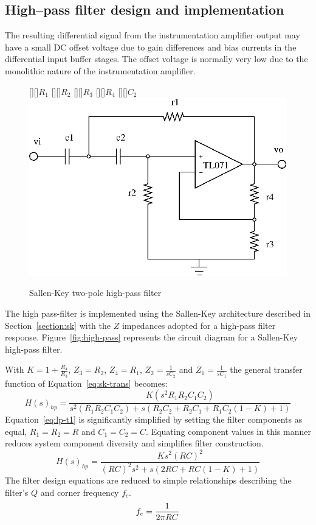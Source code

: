 \subsection{High--pass filter design and implementation}
The resulting differential signal from the instrumentation amplifier
output may have a small DC offset voltage due to gain differences and
bias currents in the differential input buffer stages. The offset
voltage is normally very low due to the monolithic nature of the
instrumentation amplifier.

\begin{figure}[htbp]
	[][]{$R_1$} 
	[][]{$R_2$} 
	[][]{$R_3$} 
	[][]{$R_4$} 
	[][]{$C_2$} 
	\psfrag{+}{+}
	\psfrag{-}{--}
	\includegraphics{high-pass.eps}
	\caption{Sallen-Key two-pole high-pass filter}
	\label{fig:high-pass} 
\end{figure}

The high pass-filter is implemented using the Sallen-Key architecture
described in Section~\vref{section:sk} with the $Z$ impedances adopted
for a high-pass filter response. Figure~\vref{fig:high-pass}
represents the circuit diagram for a Sallen-Key high-pass filter.

With $K = 1 + \frac{R_4}{R_3}$, $Z_3 = R_2$, $Z_4 = R_1$, $Z_2 =
\frac{1}{sC_2}$ and $Z_1 = \frac{1}{sC_1}$ the general transfer
function of Equation~\ref{eq:sk-trans} becomes:
\begin{equation}
	H(s)_{hp} = \frac{K(s^2R_1R_2C_1C_2)}{s^2(R_1R_2C_1C_2) + s(R_2C_2
	+ R_2C_1 + R_1C_2(1 - K) + 1)}
	\label{eq:lp-t1}
\end{equation}
Equation~\ref{eq:lp-t1} is significantly simplified by setting the
filter components as equal, $R_1 = R_2 = R$ and $C_1 = C_2 =
C$. Equating component values in this manner reduces system component
diversity and simplifies filter construction.
\begin{equation}
	H(s)_{hp} = \frac{Ks^2(RC)^2}{(RC)^2s^2 + s(2RC + RC(1 - K) + 1)}
	\label{eq:simp-hp}
\end{equation}
The filter design equations are reduced to simple relationships
describing the filter's $Q$ and corner frequency $f_c$.
\begin{equation}
	f_c = \frac{1}{2\pi\/RC}
	\label{eq:hp-fc}
\end{equation}

